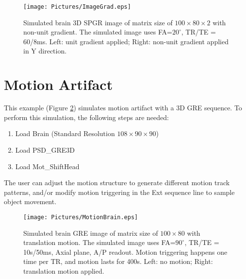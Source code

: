 \documentclass{book}%
\begin{document}
\begin{figure}[htbp]
	\centering
		\texttt{[image: Pictures/ImageGrad.eps]}
	\caption{Simulated brain 3D SPGR image of matrix size of $100 \times 80 \times 2$ with non-unit gradient. The simulated image uses FA=$20^{\circ}$, TR/TE = 60/8ms. Left: unit gradient applied; Right: non-unit gradient applied in Y direction.}
	\label{fig:ImageGrad}
\end{figure}

\section{Motion Artifact}

This example (Figure \ref{fig:MotionBrain}) simulates motion artifact with a 3D GRE sequence. To perform this simulation, the following steps are needed:

\begin{enumerate}
	\item Load Brain (Standard Resolution $108 \times 90 \times 90$)
  \item Load PSD\_GRE3D
	\item Load Mot\_ShiftHead
\end{enumerate}

The user can adjust the motion structure to generate different motion track patterns, and/or modify motion triggering in the Ext sequence line to sample object movement.

\begin{figure}[htbp]
	\centering
		\texttt{[image: Pictures/MotionBrain.eps]}
	\caption{Simulated brain GRE image of matrix size of $100 \times 80$ with translation motion. The simulated image uses FA=$90^{\circ}$, TR/TE = 10s/50ms, Axial plane, A/P readout. Motion triggering happens one time per TR, and motion lasts for 400s. Left: no motion; Right: translation motion applied.}
	\label{fig:MotionBrain}
\end{figure}
\end{document}
